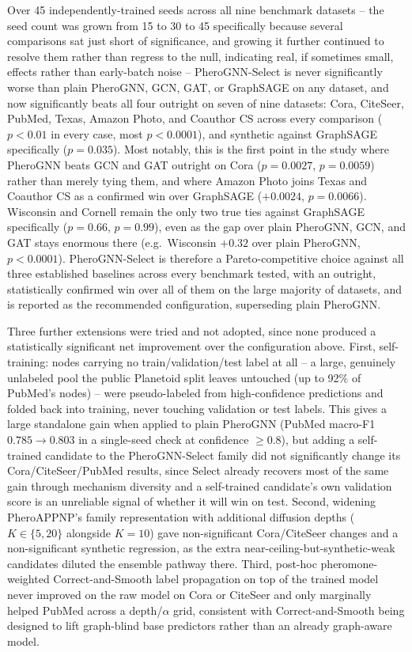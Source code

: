 Over 45 independently-trained seeds across all nine benchmark datasets -- the seed count was grown from 15 to 30 to 45 specifically because several comparisons sat just short of significance, and growing it further continued to resolve them rather than regress to the null, indicating real, if sometimes small, effects rather than early-batch noise -- PheroGNN-Select is never significantly worse than plain PheroGNN, GCN, GAT, or GraphSAGE on any dataset, and now significantly beats all four outright on seven of nine datasets: Cora, CiteSeer, PubMed, Texas, Amazon Photo, and Coauthor CS across every comparison ($p<0.01$ in every case, most $p<0.0001$), and synthetic against GraphSAGE specifically ($p=0.035$). Most notably, this is the first point in the study where PheroGNN beats GCN and GAT outright on Cora ($p=0.0027$, $p=0.0059$) rather than merely tying them, and where Amazon Photo joins Texas and Coauthor CS as a confirmed win over GraphSAGE ($+0.0024$, $p=0.0066$). Wisconsin and Cornell remain the only two true ties against GraphSAGE specifically ($p=0.66$, $p=0.99$), even as the gap over plain PheroGNN, GCN, and GAT stays enormous there (e.g.\ Wisconsin $+0.32$ over plain PheroGNN, $p<0.0001$). PheroGNN-Select is therefore a Pareto-competitive choice against all three established baselines across every benchmark tested, with an outright, statistically confirmed win over all of them on the large majority of datasets, and is reported as the recommended configuration, superseding plain PheroGNN.

Three further extensions were tried and not adopted, since none produced a statistically significant net improvement over the configuration above. First, self-training: nodes carrying no train/validation/test label at all -- a large, genuinely unlabeled pool the public Planetoid split leaves untouched (up to 92\% of PubMed's nodes) -- were pseudo-labeled from high-confidence predictions and folded back into training, never touching validation or test labels. This gives a large standalone gain when applied to plain PheroGNN (PubMed macro-F1 $0.785 \to 0.803$ in a single-seed check at confidence $\geq 0.8$), but adding a self-trained candidate to the PheroGNN-Select family did not significantly change its Cora/CiteSeer/PubMed results, since Select already recovers most of the same gain through mechanism diversity and a self-trained candidate's own validation score is an unreliable signal of whether it will win on test. Second, widening PheroAPPNP's family representation with additional diffusion depths ($K \in \{5, 20\}$ alongside $K=10$) gave non-significant Cora/CiteSeer changes and a non-significant synthetic regression, as the extra near-ceiling-but-synthetic-weak candidates diluted the ensemble pathway there. Third, post-hoc pheromone-weighted Correct-and-Smooth label propagation on top of the trained model never improved on the raw model on Cora or CiteSeer and only marginally helped PubMed across a depth/$\alpha$ grid, consistent with Correct-and-Smooth being designed to lift graph-blind base predictors rather than an already graph-aware model.

